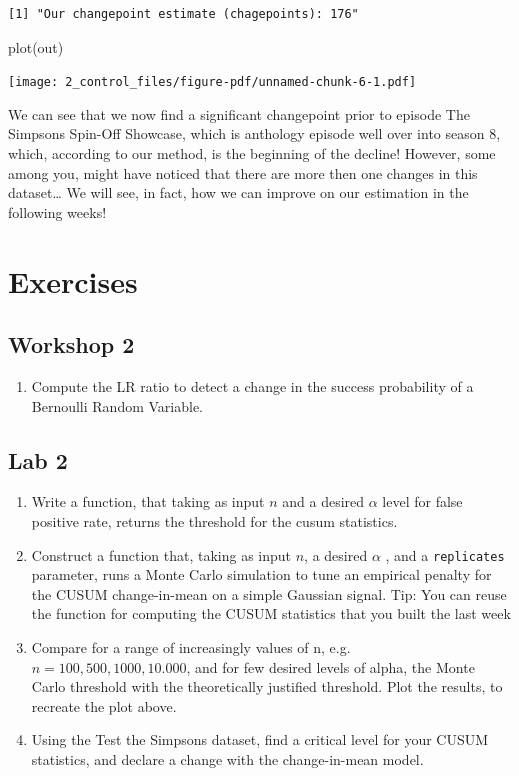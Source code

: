 \documentclass[
  letterpaper,
  DIV=11,
  numbers=noendperiod]{scrreprt}
\newenvironment{Shaded}{\begin{snugshade}}{\end{snugshade}}
\newcommand{\FunctionTok}[1]{\textcolor[rgb]{0.28,0.35,0.67}{#1}}
\newcommand{\NormalTok}[1]{\textcolor[rgb]{0.00,0.23,0.31}{#1}}
\providecommand{\tightlist}{%
  \setlength{\itemsep}{0pt}\setlength{\parskip}{0pt}}\usepackage{longtable,booktabs,array}
\begin{document}
\begin{verbatim}
[1] "Our changepoint estimate (chagepoints): 176"
\end{verbatim}

\begin{Shaded}
\begin{Highlighting}[]
\FunctionTok{plot}\NormalTok{(out)}
\end{Highlighting}
\end{Shaded}

\texttt{[image: 2\_control\_files/figure-pdf/unnamed-chunk-6-1.pdf]}

We can see that we now find a significant changepoint prior to episode
The Simpsons Spin-Off Showcase, which is anthology episode well over
into season 8, which, according to our method, is the beginning of the
decline! However, some among you, might have noticed that there are more
then one changes in this dataset\ldots{} We will see, in fact, how we
can improve on our estimation in the following weeks!

\section{Exercises}\label{exercises-1}

\subsection{Workshop 2}\label{workshop-2}

\begin{enumerate}
\def\labelenumi{\arabic{enumi}.}
\tightlist
\item
  Compute the LR ratio to detect a change in the success probability of
  a Bernoulli Random Variable.
\end{enumerate}

\subsection{Lab 2}\label{lab-2}

\begin{enumerate}
\def\labelenumi{\arabic{enumi}.}
\item
  Write a function, that taking as input \(n\) and a desired \(\alpha\)
  level for false positive rate, returns the threshold for the cusum
  statistics.
\item
  Construct a function that, taking as input \(n\), a desired \(\alpha\)
  , and a \texttt{replicates} parameter, runs a Monte Carlo simulation
  to tune an empirical penalty for the CUSUM change-in-mean on a simple
  Gaussian signal. Tip: You can reuse the function for computing the
  CUSUM statistics that you built the last week
\item
  Compare for a range of increasingly values of n,
  e.g.~\(n = 100, 500, 1000, 10.000\), and for few desired levels of
  alpha, the Monte Carlo threshold with the theoretically justified
  threshold. Plot the results, to recreate the plot above.
\item
  Using the Test the Simpsons dataset, find a critical level for your
  CUSUM statistics, and declare a change with the change-in-mean model.
\end{enumerate}
\end{document}
